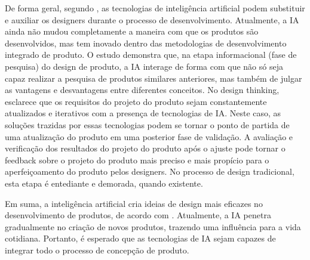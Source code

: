 De forma geral, segundo , as tecnologias de inteligência artificial podem substituir e auxiliar os designers durante o processo de desenvolvimento. Atualmente, a IA ainda não mudou completamente a maneira com que os produtos são desenvolvidos, mas tem inovado dentro das metodologias de desenvolvimento integrado de produto. O estudo demonstra que, na etapa informacional (fase de pesquisa) do design de produto, a IA interage de forma com que não só seja capaz realizar a pesquisa de produtos similares anteriores, mas também de julgar as vantagens e desvantagens entre diferentes conceitos. No design thinking,  esclarece que os requisitos do projeto do produto sejam constantemente atualizados e iterativos com a presença de tecnologias de IA. Neste caso, as soluções trazidas por essas tecnologias podem se tornar o ponto de partida de uma atualização do produto em uma posterior fase de validação. A avaliação e verificação dos resultados do projeto do produto após o ajuste pode tornar o feedback sobre o projeto do produto mais preciso e mais propício para o aperfeiçoamento do produto pelos designers. No processo de design tradicional, esta etapa é entediante e demorada, quando existente.

Em suma, a inteligência artificial cria ideias de design mais eficazes no desenvolvimento de produtos, de acordo com . Atualmente, a IA penetra gradualmente no criação de novos produtos, trazendo uma influência para a vida cotidiana. Portanto, é esperado que as tecnologias de IA sejam capazes de integrar todo o processo de concepção de produto.
